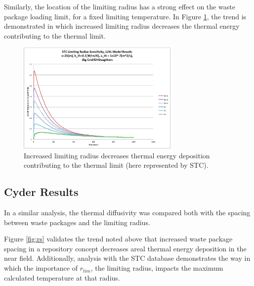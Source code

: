 Similarly, the location of the limiting radius has a strong effect on the 
waste package loading limit, for a fixed limiting temperature. In Figure 
\ref{fig:Cm242r_lim_sens}, the trend is demonstrated in which increased limiting 
radius decreases the thermal energy contributing to the thermal limit. 


\begin{figure}[htbp!]
\begin{center}
\includegraphics[width=0.7\textwidth]{./chapters/demonstration/spacing/Cm242r_lim_sens.eps}
\end{center}
\caption[$K_{th}$ Sensitivity to $r_{lim}$]{Increased limiting radius 
decreases thermal energy deposition contributing to the thermal limit
(here represented by \gls{STC}).}
\label{fig:Cm242r_lim_sens}
\end{figure}


\FloatBarrier
\subsection{Cyder Results}

In a similar analysis, the thermal diffusivity was compared both with the 
spacing between waste packages and the limiting radius. 

Figure \ref{fig:rs} validates the trend noted above that 
increased waste package spacing in a repository concept decreases areal thermal energy deposition 
in the near field.  Additionally, analysis with the \Cyder STC database 
demonstrates the way in which the importance of $r_{lim}$, the limiting radius, 
impacts the maximum calculated temperature at that radius. 


